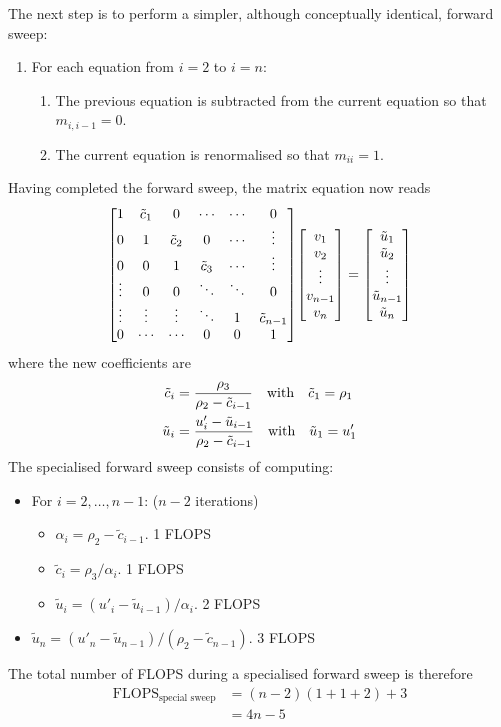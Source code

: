 \documentclass[reprint,english]{revtex4-1}
\begin{document}
\newpage
The next step is to perform a simpler, although conceptually identical, forward sweep:
\begin{enumerate}
\item[] For each equation from \(i=2\) to \(i=n\):
\begin{enumerate}
	\item The previous equation is subtracted from the current equation so that \(m_{i,i-1}=0\).
	\item The current equation is renormalised so that \(m_{ii}=1\).
\end{enumerate}
\end{enumerate}
Having completed the forward sweep, the matrix equation now reads
\[\mqty[1 & \tilde{c}_1 & 0 & \cdots & \cdots & 0 \\
0 & 1 & \tilde{c}_2 & 0 & \cdots & \vdots \\
0 & 0 & 1 & \tilde{c}_3 & \cdots & \vdots \\
\vdots & 0 & 0 & \ddots & \ddots & 0 \\
\vdots & \vdots & \vdots & \ddots & 1 & \tilde{c}_{n-1} \\
0 & \cdots & \cdots & 0 & 0 & 1]\mqty[v_1 \\ v_2 \\ \vdots \\ v_{n-1} \\ v_n]=\mqty[\tilde{u}_1 \\ \tilde{u}_2 \\ \vdots \\ \tilde{u}_{n-1} \\ \tilde{u}_n]\]
where the new coefficients are
\begin{align}
\tilde{c}_i&=\frac{\rho_3}{\rho_2-\tilde{c}_{i-1}}\qq{with}\tilde{c}_1=\rho_1\\
\tilde{u}_i&=\frac{u'_i-\tilde{u}_{i-1}}{\rho_2-\tilde{c}_{i-1}}\qq{with}\tilde{u}_1=u'_1
\end{align}
\noindent The specialised forward sweep consists of computing:
\begin{itemize}
\renewcommand\labelitemi{\(\times\)}
\renewcommand\labelitemii{\(\to\)}
\item For \(i=2,\ldots,n-1\): (\(n-2\) iterations)
	\begin{itemize}
	\item \(\alpha_i=\rho_2-\tilde{c}_{i-1}\). 1 FLOPS
	\item \(\tilde{c}_i=\rho_3/\alpha_i\). 1 FLOPS
	\item \(\tilde{u}_i=(u'_i-\tilde{u}_{i-1})/\alpha_i\). 2 FLOPS
	\end{itemize}
\item \(\tilde{u}_n=(u'_n-\tilde{u}_{n-1})/(\rho_2-\tilde{c}_{n-1})\). 3 FLOPS
\end{itemize}
The total number of FLOPS during a specialised forward sweep is therefore
\begin{align}
\text{FLOPS}_{\text{special sweep}}&=(n-2)(1+1+2)+3\nonumber\\
&=4n-5
\end{align}
\end{document}
